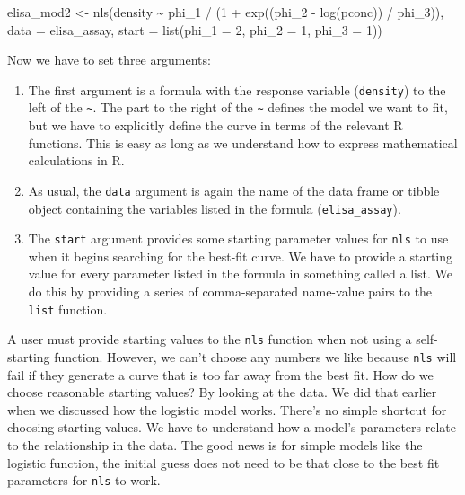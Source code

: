\documentclass[
]{book}
\newenvironment{Shaded}{\begin{snugshade}}{\end{snugshade}}
\newcommand{\AttributeTok}[1]{\textcolor[rgb]{0.77,0.63,0.00}{#1}}
\newcommand{\DecValTok}[1]{\textcolor[rgb]{0.00,0.00,0.81}{#1}}
\newcommand{\FunctionTok}[1]{\textcolor[rgb]{0.00,0.00,0.00}{#1}}
\newcommand{\NormalTok}[1]{#1}
\newcommand{\OtherTok}[1]{\textcolor[rgb]{0.56,0.35,0.01}{#1}}
\newcommand{\SpecialCharTok}[1]{\textcolor[rgb]{0.00,0.00,0.00}{#1}}
\begin{document}
\begin{Shaded}
\begin{Highlighting}[]
\NormalTok{elisa\_mod2 }\OtherTok{\textless{}{-}}
  \FunctionTok{nls}\NormalTok{(density }\SpecialCharTok{\textasciitilde{}}\NormalTok{ phi\_1 }\SpecialCharTok{/}\NormalTok{ (}\DecValTok{1} \SpecialCharTok{+} \FunctionTok{exp}\NormalTok{((phi\_2 }\SpecialCharTok{{-}} \FunctionTok{log}\NormalTok{(pconc)) }\SpecialCharTok{/}\NormalTok{ phi\_3)),}
      \AttributeTok{data =}\NormalTok{ elisa\_assay,}
      \AttributeTok{start =} \FunctionTok{list}\NormalTok{(}\AttributeTok{phi\_1 =} \DecValTok{2}\NormalTok{, }\AttributeTok{phi\_2 =} \DecValTok{1}\NormalTok{, }\AttributeTok{phi\_3 =} \DecValTok{1}\NormalTok{))}
\end{Highlighting}
\end{Shaded}

Now we have to set three arguments:

\begin{enumerate}
\def\labelenumi{\arabic{enumi}.}
\item
  The first argument is a formula with the response variable (\texttt{density}) to the left of the \texttt{\textasciitilde{}}. The part to the right of the \texttt{\textasciitilde{}} defines the model we want to fit, but we have to explicitly define the curve in terms of the relevant R functions. This is easy as long as we understand how to express mathematical calculations in R.
\item
  As usual, the \texttt{data} argument is again the name of the data frame or tibble object containing the variables listed in the formula (\texttt{elisa\_assay}).
\item
  The \texttt{start} argument provides some starting parameter values for \texttt{nls} to use when it begins searching for the best-fit curve. We have to provide a starting value for every parameter listed in the formula in something called a list. We do this by providing a series of comma-separated name-value pairs to the \texttt{list} function.
\end{enumerate}

A user must provide starting values to the \texttt{nls} function when not using a self-starting function. However, we can't choose any numbers we like because \texttt{nls} will fail if they generate a curve that is too far away from the best fit. How do we choose reasonable starting values? By looking at the data. We did that earlier when we discussed how the logistic model works. There's no simple shortcut for choosing starting values. We have to understand how a model's parameters relate to the relationship in the data. The good news is for simple models like the logistic function, the initial guess does not need to be that close to the best fit parameters for \texttt{nls} to work.
\end{document}
